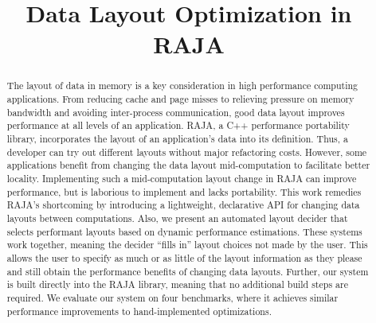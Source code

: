 \documentclass[sigconf, table]{acmart}
\title{Data Layout Optimization in RAJA}
\newcommand{\todo}[1]{{\textcolor{red}{{\tt{TODO:}}\,\,#1 }}}
\begin{document}
\begin{abstract}



The layout of data in memory is a key consideration in high performance computing applications.
From reducing cache and page misses to relieving pressure on memory bandwidth and avoiding inter-process communication, good data layout improves performance at all levels of an application.
RAJA, a C++ performance portability library, incorporates the layout of an application's data into its definition.
Thus, a developer can try out different layouts without major refactoring costs.
However, some applications benefit from changing the data layout mid-computation to facilitate better locality.
Implementing such a mid-computation layout change in RAJA can improve performance, but is laborious to implement and lacks portability.
This work remedies RAJA's shortcoming by introducing a lightweight, declarative API for changing data layouts between computations.
Also, we present an automated layout decider that selects performant layouts based on dynamic performance estimations. 
These systems work together, meaning the decider \enquote{fills in} layout choices not made by the user.
This allows the user to specify as much or as little of the layout information as they please and still obtain the performance benefits of changing data layouts.  
Further, our system is built directly into the RAJA library, meaning that no additional build steps are required.
We evaluate our system on four benchmarks, where it achieves similar performance improvements to hand-implemented optimizations.
\end{abstract}
\end{document}
